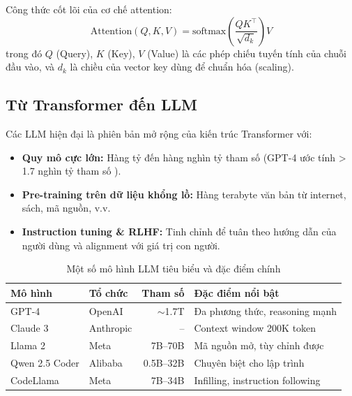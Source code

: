 \documentclass{nt521report}
\begin{document}
Công thức cốt lõi của cơ chế attention:
\begin{equation}
  \text{Attention}(Q, K, V) = \text{softmax}\!\left(\frac{QK^\top}{\sqrt{d_k}}\right) V
  \label{eq:attention}
\end{equation}
trong đó $Q$ (Query), $K$ (Key), $V$ (Value) là các phép chiếu tuyến tính của chuỗi đầu vào, và $d_k$ là chiều của vector key dùng để chuẩn hóa (scaling).

\subsection{Từ Transformer đến LLM}

Các LLM hiện đại là phiên bản mở rộng của kiến trúc Transformer với:
\begin{itemize}
  \item \textbf{Quy mô cực lớn:} Hàng tỷ đến hàng nghìn tỷ tham số (GPT-4 ước tính > 1.7 nghìn tỷ tham số \cite{openai2023gpt4}).
  \item \textbf{Pre-training trên dữ liệu khổng lồ:} Hàng terabyte văn bản từ internet, sách, mã nguồn, v.v.
  \item \textbf{Instruction tuning \& RLHF:} Tinh chỉnh để tuân theo hướng dẫn của người dùng và alignment với giá trị con người.
\end{itemize}

\begin{table}[H]
  \centering
  \caption{Một số mô hình LLM tiêu biểu và đặc điểm chính}
  \label{tab:llm-models}
  \begin{tabularx}{\textwidth}{l l r X}
    \toprule
    \textbf{Mô hình}   & \textbf{Tổ chức} & \textbf{Tham số} & \textbf{Đặc điểm nổi bật} \\
    \midrule
    GPT-4               & OpenAI           & $\sim$1.7T  & Đa phương thức, reasoning mạnh \\
    Claude 3            & Anthropic        & --           & Context window 200K token \\
    Llama 2             & Meta             & 7B--70B      & Mã nguồn mở, tùy chỉnh được \\
    Qwen 2.5 Coder      & Alibaba          & 0.5B--32B    & Chuyên biệt cho lập trình \\
    CodeLlama           & Meta             & 7B--34B      & Infilling, instruction following \\
    \bottomrule
  \end{tabularx}
\end{table}
\end{document}
